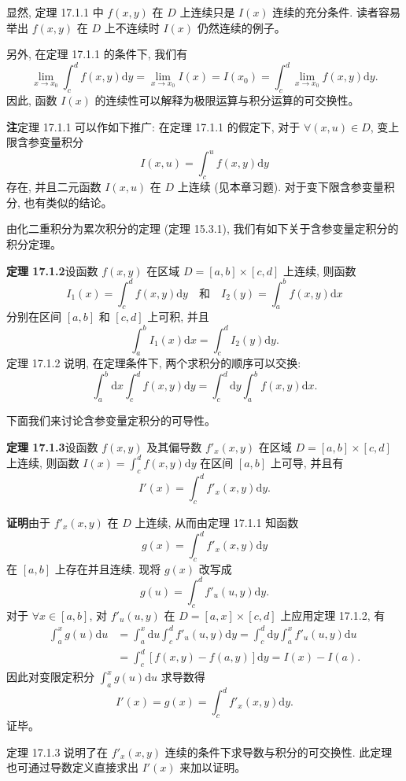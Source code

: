 \documentclass[UTF8,12pt,a4paper,fontset=fandol]{ctexart}
\begin{document}
显然, 定理 17.1.1 中 $f(x,y)$ 在 $D$ 上连续只是 $I(x)$ 连续的充分条件. 读者容易举出 $f(x,y)$ 在 $D$ 上不连续时 $I(x)$ 仍然连续的例子。

另外, 在定理 17.1.1 的条件下, 我们有
\[
  \lim_{x\to x_0}\int_c^d f(x,y)\mathrm dy
  =\lim_{x\to x_0} I(x)
  =I(x_0)
  =\int_c^d \lim_{x\to x_0} f(x,y)\mathrm dy.
\]
因此, 函数 $I(x)$ 的连续性可以解释为极限运算与积分运算的可交换性。

\noindent\textbf{注}\quad 定理 17.1.1 可以作如下推广: 在定理 17.1.1 的假定下, 对于 $\forall(x,u)\in D$, 变上限含参变量积分
\[
  I(x,u)=\int_c^u f(x,y)\mathrm dy
\]
存在, 并且二元函数 $I(x,u)$ 在 $D$ 上连续 (见本章习题). 对于变下限含参变量积分, 也有类似的结论。

由化二重积分为累次积分的定理 (定理 15.3.1), 我们有如下关于含参变量定积分的积分定理。

\noindent\textbf{定理 17.1.2}\quad 设函数 $f(x,y)$ 在区域 $D=[a,b]\times[c,d]$ 上连续, 则函数
\[
  I_1(x)=\int_c^d f(x,y)\mathrm dy
  \quad\text{和}\quad
  I_2(y)=\int_a^b f(x,y)\mathrm dx
\]
分别在区间 $[a,b]$ 和 $[c,d]$ 上可积, 并且
\[
  \int_a^b I_1(x)\mathrm dx=\int_c^d I_2(y)\mathrm dy.
\]
定理 17.1.2 说明, 在定理条件下, 两个求积分的顺序可以交换:
\[
  \int_a^b \mathrm dx\int_c^d f(x,y)\mathrm dy
  =
  \int_c^d \mathrm dy\int_a^b f(x,y)\mathrm dx.
\]

下面我们来讨论含参变量定积分的可导性。

\noindent\textbf{定理 17.1.3}\quad 设函数 $f(x,y)$ 及其偏导数 $f'_x(x,y)$ 在区域 $D=[a,b]\times[c,d]$ 上连续, 则函数 $I(x)=\int_c^d f(x,y)\mathrm dy$ 在区间 $[a,b]$ 上可导, 并且有
\[
  I'(x)=\int_c^d f'_x(x,y)\mathrm dy.
\]

\noindent\textbf{证明}\quad 由于 $f'_x(x,y)$ 在 $D$ 上连续, 从而由定理 17.1.1 知函数
\[
  g(x)=\int_c^d f'_x(x,y)\mathrm dy
\]
在 $[a,b]$ 上存在并且连续. 现将 $g(x)$ 改写成
\[
  g(u)=\int_c^d f'_u(u,y)\mathrm dy.
\]
对于 $\forall x\in[a,b]$, 对 $f'_u(u,y)$ 在 $D=[a,x]\times[c,d]$ 上应用定理 17.1.2, 有
\[
\begin{aligned}
  \int_a^x g(u)\mathrm du
  &=\int_a^x \mathrm du\int_c^d f'_u(u,y)\mathrm dy
    =\int_c^d \mathrm dy\int_a^x f'_u(u,y)\mathrm du\\
  &=\int_c^d [f(x,y)-f(a,y)]\mathrm dy
    = I(x)-I(a).
\end{aligned}
\]
因此对变限定积分 $\int_a^x g(u)\mathrm du$ 求导数得
\[
  I'(x)=g(x)=\int_c^d f'_x(x,y)\mathrm dy.
\]
证毕。

定理 17.1.3 说明了在 $f'_x(x,y)$ 连续的条件下求导数与积分的可交换性. 此定理也可通过导数定义直接求出 $I'(x)$ 来加以证明。
\end{document}
